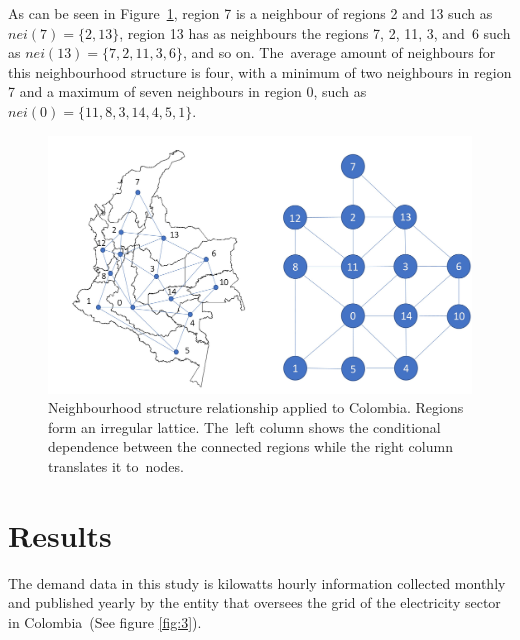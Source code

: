 \documentclass[energies,article,accept,pdftex,moreauthors]{Definitions/mdpi}
\begin{document}
    As can be seen in Figure~\ref{fig:2}, region 7 is a neighbour of regions 2 and 13 such as \(nei(7)=\{2,13\}\), region 13 has as neighbours the regions 7, 2, 11, 3, and~6 such as \(nei(13)=\{7,2,11,3,6\}\), and so on. The~average amount of neighbours for this neighbourhood structure is four, with a minimum of two neighbours in region 7 and a maximum of seven neighbours in region 0, such as \(nei(0)=\{11,8,3,14,4,5,1\}\).
    \vspace{-12 pt} 


    \begin{figure}[H]
\hspace{-2em}
    \centering
		\includegraphics[scale=.85]{figs/Markov_Random_Fields.jpg}
	\caption{Neighbourhood structure relationship applied to Colombia. Regions form an irregular lattice. The~left column shows the conditional dependence between the connected regions while the right column translates it to~nodes. \label{fig:2}}
    \end{figure}

\section{Results}

The demand data in this study is kilowatts hourly information collected monthly and published yearly by the entity that oversees the grid of the electricity sector in Colombia~\citep{XMHistoricalDemand}(See figure \ref{fig:3}).
\end{document}
